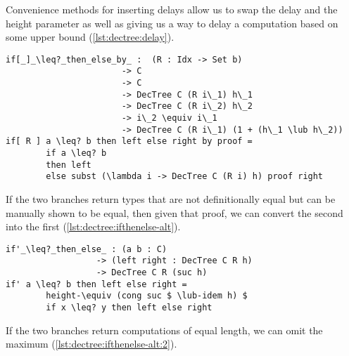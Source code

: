 Convenience methods for inserting delays allow us to swap the delay and the height parameter as well as giving us a way to delay a computation based on some upper bound (\autoref{lst:dectree:delay}).

\begin{lstlisting}[caption={Alternatives to if-then-else},label={lst:dectree:ifthenelse-alt},emph={if,then,else,by,DecTree,\_then\_else\_by\_,\[\_\]\_}]
if[_]_\leq?_then_else_by_ :  (R : Idx -> Set b)
                       -> C
                       -> C
                       -> DecTree C (R i\_1) h\_1
                       -> DecTree C (R i\_2) h\_2
                       -> i\_2 \equiv i\_1
                       -> DecTree C (R i\_1) (1 + (h\_1 \lub h\_2))
if[ R ] a \leq? b then left else right by proof =
        if a \leq? b
        then left
        else subst (\lambda i -> DecTree C (R i) h) proof right
\end{lstlisting}

If the two branches return types that are not definitionally equal but can be manually shown to be equal, then given that proof, we can convert the second into the first (\autoref{lst:dectree:ifthenelse-alt}).

\begin{lstlisting}[caption={Alternatives to if-then-else},label={lst:dectree:ifthenelse-alt:2},emph={if'\_,\_then\_else\_,if,then,else,DecTree}]
if'_\leq?_then_else_ : (a b : C)
                  -> (left right : DecTree C R h)
                  -> DecTree C R (suc h)
if' a \leq? b then left else right =
        height-\equiv (cong suc $ \lub-idem h) $
        if x \leq? y then left else right
\end{lstlisting}

If the two branches return computations of equal length, we can omit the maximum (\autoref{lst:dectree:ifthenelse-alt:2}).

